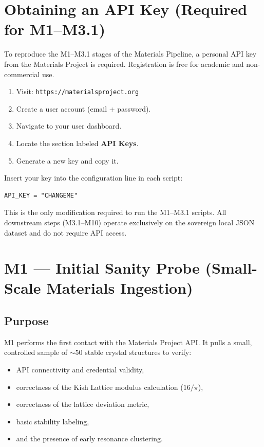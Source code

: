 \documentclass[11pt, letterpaper, openany]{book}
\begin{document}
\section*{Obtaining an API Key (Required for M1–M3.1)}
To reproduce the M1--M3.1 stages of the Materials Pipeline, a personal API key
from the Materials Project is required. Registration is free for academic and
non-commercial use.

\begin{enumerate}
    \item Visit: \texttt{https://materialsproject.org}
    \item Create a user account (email + password).
    \item Navigate to your user dashboard.
    \item Locate the section labeled \textbf{API Keys}.
    \item Generate a new key and copy it.
\end{enumerate}

Insert your key into the configuration line in each script:

\begin{verbatim}
API_KEY = "CHANGEME"
\end{verbatim}

This is the only modification required to run the M1--M3.1 scripts. All
downstream steps (M3.1--M10) operate exclusively on the sovereign local JSON
dataset and do not require API access.


\section{M1 — Initial Sanity Probe (Small-Scale Materials Ingestion)}

\subsection*{Purpose}
M1 performs the first contact with the Materials Project API. It pulls a small,
controlled sample of $\sim$50 stable crystal structures to verify:

\begin{itemize}
    \item API connectivity and credential validity,
    \item correctness of the Kish Lattice modulus calculation ($16/\pi$),
    \item correctness of the lattice deviation metric,
    \item basic stability labeling,
    \item and the presence of early resonance clustering.
\end{itemize}
\end{document}
